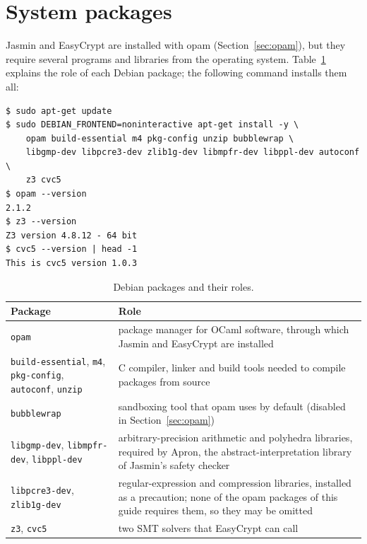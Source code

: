 \documentclass[11pt,a4paper]{article}
\begin{document}
\section{System packages}
\label{sec:apt}

Jasmin and EasyCrypt are installed with opam (Section~\ref{sec:opam}), but
they require several programs and libraries from the operating system.
Table~\ref{tab:packages} explains the role of each Debian package; the
following command installs them all:

\begin{lstlisting}[style=shell]
$ sudo apt-get update
$ sudo DEBIAN_FRONTEND=noninteractive apt-get install -y \
    opam build-essential m4 pkg-config unzip bubblewrap \
    libgmp-dev libpcre3-dev zlib1g-dev libmpfr-dev libppl-dev autoconf \
    z3 cvc5
$ opam --version
2.1.2
$ z3 --version
Z3 version 4.8.12 - 64 bit
$ cvc5 --version | head -1
This is cvc5 version 1.0.3
\end{lstlisting}

\begin{table}[h]
\centering\small
\begin{tabularx}{\textwidth}{@{}lX@{}}
\toprule
\textbf{Package} & \textbf{Role} \\
\midrule
\texttt{opam} & package manager for OCaml software, through which Jasmin and EasyCrypt are installed \\
\texttt{build-essential}, \texttt{m4}, \texttt{pkg-config}, \texttt{autoconf}, \texttt{unzip} & C compiler, linker and build tools needed to compile packages from source \\
\texttt{bubblewrap} & sandboxing tool that opam uses by default (disabled in Section~\ref{sec:opam}) \\
\texttt{libgmp-dev}, \texttt{libmpfr-dev}, \texttt{libppl-dev} & arbitrary-precision arithmetic and polyhedra libraries, required by Apron, the abstract-interpretation library of Jasmin's safety checker \\
\texttt{libpcre3-dev}, \texttt{zlib1g-dev} & regular-expression and compression libraries, installed as a precaution; none of the opam packages of this guide requires them, so they may be omitted \\
\texttt{z3}, \texttt{cvc5} & two SMT solvers that EasyCrypt can call \\
\bottomrule
\end{tabularx}
\caption{Debian packages and their roles.}
\label{tab:packages}
\end{table}
\end{document}
